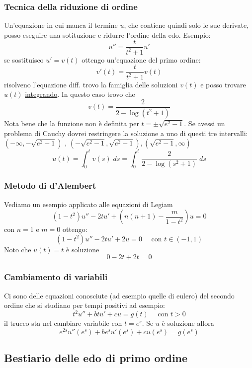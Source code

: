 \subsubsection*{Tecnica della riduzione di ordine}
Un'equazione in cui manca il termine $ u $, che contiene quindi solo le sue derivate, posso eseguire una sotituzione e ridurre l'ordine della edo. Esempio:
\[
	u''=\frac{t}{t^2+1}u'
\]
se sostituisco $ u' = v\left( t \right)  $ ottengo un'equazione del primo ordine:
\[
	v' \left( t \right) = \frac{t}{t^2+1} v\left( t \right)
\]
risolveno l'equazione diff. trovo la famiglia delle soluzioni $ v\left( t \right)  $ e posso trovare $ u\left( t \right)  $ \underline{integrando}. In questo caso trovo che
\[
	v\left( t \right)  = \frac{2}{2-\log \left( t^2+1 \right) }
\]
Nota bene che la funzione non è definita per $ t=\pm \sqrt{e^2-1}  $. Se avessi un problema di Cauchy dovrei restringere la soluzione a uno di questi tre intervalli: $ \left( - \infty, -\sqrt{e^2-1}  \right) $ , $  \left( -\sqrt{e^2-1},\sqrt{e^2-1} \right), \left( \sqrt{e^2-1}, \infty \right) $
\[
	u\left( t \right) = \int_{0}^{t} v\left( s \right)  \; ds =  \int_{0}^{t} \frac{2}{2-\log \left( s^2+1 \right) } \; ds
\]
\subsubsection*{Metodo di d'Alembert}
Vediamo un esempio applicato alle equazioni di Legiam
\[
	\left( 1-t^2 \right) u'' - 2tu' + \left( n\left( n+1 \right) -\frac{m}{1-t^2} \right) u=0
\]
con $ n=1 $ e $ m=0 $ ottengo:
\[
	\left( 1-t^2 \right) u'' -2tu' + 2u=0 \quad \text{ con }t \in \left( -1,1 \right)
\]
Noto che $ u\left( t \right) =t $ è soluzione
\[
	0 - 2t + 2t =0
\]
\subsubsection*{Cambiamento di variabili}
Ci sono delle equazioni conosciute (ad esempio quelle di eulero) del secondo ordine che si studiano per tempi positivi ad esempio:
\[
	t^2 u'' + btu' + cu = g\left( t \right) \quad  \text{ con } t > 0
\]
il trucco sta nel cambiare variabile con $ t= e^{s} $. Se $ u $ è soluzione allora
\[
	e^{2s} u'' \left( e^{s} \right) + b e^{s}u'\left( e^{s} \right) + cu\left( e^{s} \right) = g\left( e^{s} \right)
\]

\subsection*{Bestiario delle edo di primo ordine}
